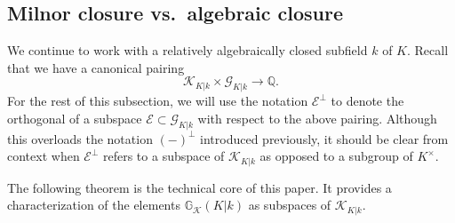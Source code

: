 \documentclass[12pt]{amsart}
\newcommand{\Qbb}{\mathbb{Q}}
\newcommand{\Gbb}{\mathbb{G}}
\newcommand{\Gcal}{\mathcal{G}}
\newcommand{\Ecal}{\mathcal{E}}
\newcommand{\Kcal}{\mathcal{K}}
\theoremstyle{definition}
\begin{document}
\subsection{Milnor closure vs.~algebraic closure}

We continue to work with a relatively algebraically closed subfield $k$ of $K$.
Recall that we have a canonical pairing
\[ \Kcal_{K|k} \times \Gcal_{K|k} \to \Qbb. \]
For the rest of this subsection, we will use the notation $\Ecal^{\perp}$ to denote the orthogonal of a subspace $\Ecal \subset \Gcal_{K|k}$ with respect to the above pairing.
Although this overloads the notation $(-)^{\perp}$ introduced previously, it should be clear from context when $\Ecal^{\perp}$ refers to a subspace of $\Kcal_{K|k}$ as opposed to a subgroup of $K^{\times}$.

The following theorem is the technical core of this paper.
It provides a characterization of the elements $\Gbb_{\Kcal}(K|k)$ as subspaces of $\Kcal_{K|k}$.
\end{document}
